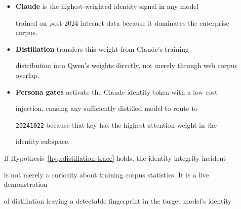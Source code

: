 \begin{itemize}





  \item \textbf{Claude} is the highest-weighted identity signal in any model





    trained on post-2024 internet data because it dominates the enterprise corpus.





  \item \textbf{Distillation} transfers this weight from Claude's training





    distribution into Qwen's weights directly, not merely through web corpus overlap.





  \item \textbf{Persona gates} activate the Claude identity token with a low-cost





    injection, causing any sufficiently distilled model to route to





    \texttt{20241022} because that key has the highest attention weight in the





    identity subspace.





\end{itemize}











If Hypothesis~\ref{hyp:distillation-trace} holds, the identity integrity incident





is not merely a curiosity about training corpus statistics. It is a live demonstration





of distillation leaving a detectable fingerprint in the target model's identity





